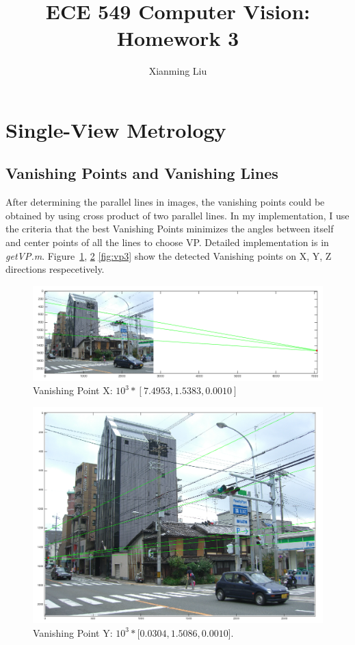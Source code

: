 \documentclass[11pt]{article}
\begin{document}
 
 
\title{ECE 549 Computer Vision: Homework 3}
\author{Xianming Liu} %
 
\maketitle
 
\section{Single-View Metrology}

\subsection{Vanishing Points and Vanishing Lines}
After determining the parallel lines in images, the vanishing points could be obtained by using cross product of two parallel lines. In my implementation, I use the criteria that the best Vanishing Points minimizes the angles between itself and center points of all the lines to choose VP. Detailed implementation is in \emph{getVP.m}.
Figure~\ref{fig:vp1}, \ref{fig:vp2} \ref{fig:vp3} show the detected Vanishing points on X, Y, Z directions respecetively.

\begin{figure}[htb]
\begin{center}
\includegraphics[width=0.9\linewidth]{vp1.png}
\caption{Vanishing Point X: $10^3 * [7.4953, 1.5383, 0.0010]$}
\label{fig:vp1}
\end{center}
\end{figure}

\begin{figure}[htb]
\begin{center}
\includegraphics[height=0.4\linewidth]{vp2.png}
\caption{Vanishing Point Y: $10^3 * [0.0304, 1.5086, 0.0010$].}
\label{fig:vp2}
\end{center}
\end{figure}
\end{document}
